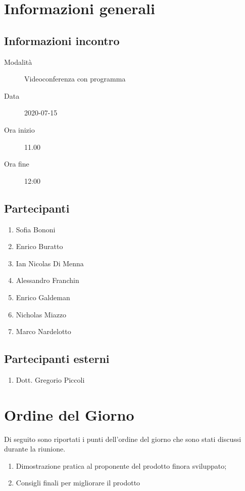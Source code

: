 \documentclass{article}
\begin{document}


\section{Informazioni generali}%
\label{sec:informazioni_generali}

\subsection{Informazioni incontro}%
\label{sub:informazioni_incontro}

\begin{description}
  \item[Modalità] Videoconferenza con programma 
  \item[Data] 2020-07-15
  \item[Ora inizio] 11.00
  \item[Ora fine] 12:00
\end{description}

\subsection{Partecipanti}%
\label{sub:partecipanti}

\begin{enumerate}
  \item Sofia Bononi
  \item Enrico Buratto
  \item Ian Nicolas Di Menna
  \item Alessandro Franchin
  \item Enrico Galdeman
  \item Nicholas Miazzo
  \item Marco Nardelotto
\end{enumerate}

\subsection{Partecipanti esterni}%
\label{sub:partecipanti esterni}

\begin{enumerate}
    \item Dott. Gregorio Piccoli
\end{enumerate}


\section{Ordine del Giorno}%
\label{ordine_del_giorno}
Di seguito sono riportati i punti dell'ordine del giorno che sono stati discussi durante la riunione.
\begin{enumerate}
  \item Dimostrazione pratica al proponente del prodotto finora sviluppato;
  \item Consigli finali per migliorare il prodotto
\end{enumerate}
\end{document}
